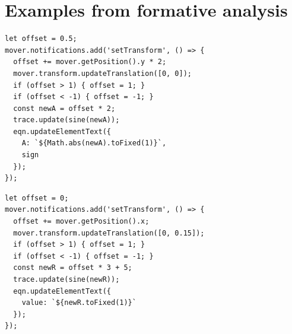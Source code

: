 \clearpage

\section{Examples from formative analysis}

\begin{minipage}{\textwidth}
\centering
\begin{minipage}[t]{0.48\textwidth}
\begin{lstlisting}[basicstyle=\ttfamily\scriptsize, frame=single, title={\texttt{fig2.js:123--139} (amplitude control)}]
let offset = 0.5;
mover.notifications.add('setTransform', () => {
  offset += mover.getPosition().y * 2;
  mover.transform.updateTranslation([0, 0]);
  if (offset > 1) { offset = 1; }
  if (offset < -1) { offset = -1; }
  const newA = offset * 2;
  trace.update(sine(newA));
  eqn.updateElementText({
    A: `${Math.abs(newA).toFixed(1)}`,
    sign
  });
});
\end{lstlisting}
\end{minipage}
\hfill
\begin{minipage}[t]{0.48\textwidth}
\begin{lstlisting}[basicstyle=\ttfamily\scriptsize, frame=single, title={\texttt{fig3.js:129--142} (wavelength control)}]
let offset = 0;
mover.notifications.add('setTransform', () => {
  offset += mover.getPosition().x;
  mover.transform.updateTranslation([0, 0.15]);
  if (offset > 1) { offset = 1; }
  if (offset < -1) { offset = -1; }
  const newR = offset * 3 + 5;
  trace.update(sine(newR));
  eqn.updateElementText({
    value: `${newR.toFixed(1)}`
  });
});
\end{lstlisting}
\end{minipage}
\label{fig:schema-duplication}
\end{minipage}

